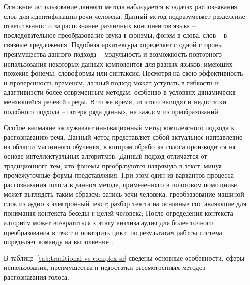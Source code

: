 Основное использование данного метода наблюдается в задачах распознавания слов для идентификации речи человека. Данный метод подразумевает разделение ответственности за распознание различных компонентов языка – последовательное преобразование звука в фонемы, фонем в слова, слов – в связные предложения. Подобная архитектура определяет с одной стороны преимущества данного подхода – модульность и возможность повторного использования некоторых данных компонентов для разных языков, имеющих похожие фонемы, словоформы или синтаксис.
Несмотря на свою эффективность и проверенность временем, данный подход может уступать в гибкости и адаптивности более современным методам, особенно в условиях динамически меняющейся речевой среды.
В то же время, из этого выходят и недостатки подобного подхода – потеря ряда данных, на каждом из преобразований.

Особое внимание заслуживает инновационный метод комплексного подхода к распознаванию речи. Данный метод представляет собой актуальное направление из области машинного обучения, в котором обработка голоса производится на основе интеллектуальных алгоритмов. Данный подход отличается от традиционного тем, что фонемы преобразуются напрямую в текст, минуя промежуточные формы представления. При этом один из вариантов процесса распознавания голоса в данном методе, примененного в голосовом помощнике, может выглядеть таким образом: запись речи человека; преобразование машиной слов из аудио в электронный текст; разбор текста на основные составляющие для понимания контекста беседы и целей человека; После определения контекста, алгоритм может возвратиться к этапу анализа аудио для более точного преобразования в текст и повторить цикл; по результатам работы система определяет команду на выполнение~\cite{Abougarair}.

В таблице~\ref{tab:traditional-vs-complex-sr} сведены основные особенности, сферы использования, преимущества и недостатки рассмотренных методов распознавания голоса.

